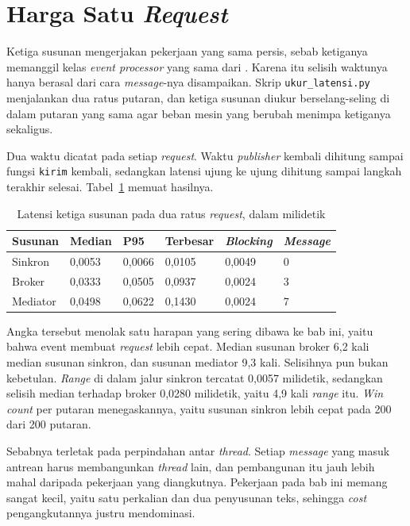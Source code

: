 \section{Harga Satu \textit{Request}}

Ketiga susunan mengerjakan pekerjaan yang sama persis, sebab ketiganya memanggil
kelas \textit{event processor} yang sama dari . Karena itu
selisih waktunya hanya berasal dari cara \textit{message}-nya disampaikan. Skrip
\texttt{ukur\_latensi.py} menjalankan dua ratus putaran, dan ketiga susunan
diukur berselang-seling di dalam putaran yang sama agar beban mesin yang
berubah menimpa ketiganya sekaligus.

Dua waktu dicatat pada setiap \textit{request}. Waktu \textit{publisher} kembali dihitung
sampai fungsi \texttt{kirim} kembali, sedangkan latensi ujung ke ujung dihitung
sampai langkah terakhir selesai. Tabel~\ref{tab:latensi-event} memuat hasilnya.

\begin{table}[htbp]
  \centering
  \caption{Latensi ketiga susunan pada dua ratus \textit{request}, dalam milidetik}
  \label{tab:latensi-event}
  \begin{tabularx}{\textwidth}{|l|l|l|l|l|X|}
    \hline
    \textbf{Susunan} & \textbf{Median} & \textbf{P95} & \textbf{Terbesar} & \textbf{\textit{Blocking}} & \textbf{\textit{Message}} \\
    \hline
    Sinkron & 0,0053 & 0,0066 & 0,0105 & 0,0049 & 0 \\
    \hline
    Broker & 0,0333 & 0,0505 & 0,0937 & 0,0024 & 3 \\
    \hline
    Mediator & 0,0498 & 0,0622 & 0,1430 & 0,0024 & 7 \\
    \hline
  \end{tabularx}
\end{table}

Angka tersebut menolak satu harapan yang sering dibawa ke bab ini, yaitu bahwa
event membuat \textit{request} lebih cepat. Median susunan broker 6,2 kali
median
susunan sinkron, dan susunan mediator 9,3 kali. Selisihnya pun bukan kebetulan.
\textit{Range} di dalam jalur sinkron tercatat 0,0057
milidetik, sedangkan
selisih median terhadap broker 0,0280 milidetik, yaitu 4,9 kali
\textit{range} itu. \textit{Win count} per putaran
menegaskannya, yaitu susunan sinkron
lebih cepat pada 200 dari 200 putaran.

Sebabnya terletak pada perpindahan antar \textit{thread}. Setiap \textit{message} yang
masuk antrean harus membangunkan \textit{thread} lain, dan pembangunan itu
jauh lebih mahal daripada pekerjaan yang diangkutnya. Pekerjaan pada bab ini
memang sangat kecil, yaitu satu perkalian dan dua penyusunan teks, sehingga
\textit{cost} pengangkutannya justru mendominasi.

